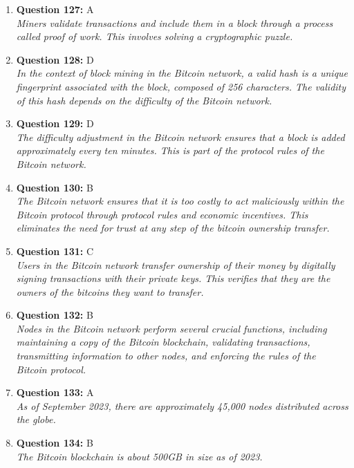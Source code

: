 \documentclass[12pt,a4paper]{article}
\begin{document}
\begin{enumerate}
\item \textbf{Question 127:} A
\\ \textit{Miners validate transactions and include them in a block through a process called proof of work. This involves solving a cryptographic puzzle.}

\item \textbf{Question 128:} D
\\ \textit{In the context of block mining in the Bitcoin network, a valid hash is a unique fingerprint associated with the block, composed of 256 characters. The validity of this hash depends on the difficulty of the Bitcoin network.}

\item \textbf{Question 129:} D
\\ \textit{The difficulty adjustment in the Bitcoin network ensures that a block is added approximately every ten minutes. This is part of the protocol rules of the Bitcoin network.}

\item \textbf{Question 130:} B
\\ \textit{The Bitcoin network ensures that it is too costly to act maliciously within the Bitcoin protocol through protocol rules and economic incentives. This eliminates the need for trust at any step of the bitcoin ownership transfer.}

\item \textbf{Question 131:} C
\\ \textit{Users in the Bitcoin network transfer ownership of their money by digitally signing transactions with their private keys. This verifies that they are the owners of the bitcoins they want to transfer.}

\item \textbf{Question 132:} B
\\ \textit{Nodes in the Bitcoin network perform several crucial functions, including maintaining a copy of the Bitcoin blockchain, validating transactions, transmitting information to other nodes, and enforcing the rules of the Bitcoin protocol.}

\item \textbf{Question 133:} A
\\ \textit{As of September 2023, there are approximately 45,000 nodes distributed across the globe.}

\item \textbf{Question 134:} B
\\ \textit{The Bitcoin blockchain is about 500GB in size as of 2023.}


\end{enumerate}
\end{document}
